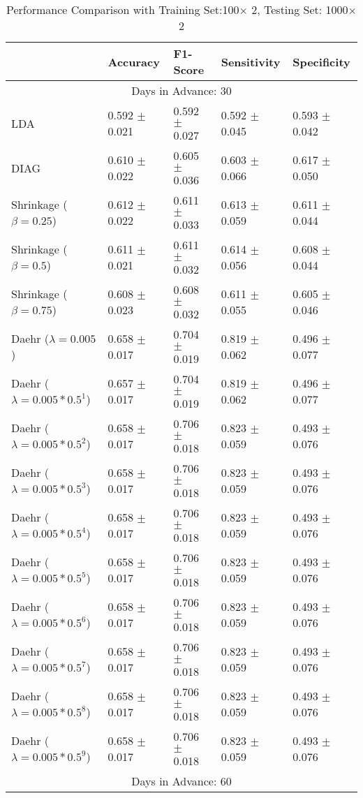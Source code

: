 \begin{table}
\caption{Performance Comparison with Training Set:100$\times$ 2, Testing Set: 1000$\times$2}
\footnotesize
\centering
\begin{tabular}{*{5}{l}}
\toprule
 & Accuracy & F1-Score & Sensitivity & Specificity\\
\hline\multicolumn{5}{c}{  Days in Advance: 30}\\\hline
LDA&0.592 $\pm$ 0.021&0.592 $\pm$ 0.027&0.592 $\pm$ 0.045&0.593 $\pm$ 0.042\\
DIAG&0.610 $\pm$ 0.022&0.605 $\pm$ 0.036&0.603 $\pm$ 0.066&0.617 $\pm$ 0.050\\
Shrinkage ($\beta=0.25$)&0.612 $\pm$ 0.022&0.611 $\pm$ 0.033&0.613 $\pm$ 0.059&0.611 $\pm$ 0.044\\
Shrinkage ($\beta=0.5$)&0.611 $\pm$ 0.021&0.611 $\pm$ 0.032&0.614 $\pm$ 0.056&0.608 $\pm$ 0.044\\
Shrinkage ($\beta=0.75$)&0.608 $\pm$ 0.023&0.608 $\pm$ 0.032&0.611 $\pm$ 0.055&0.605 $\pm$ 0.046\\
Daehr ($\lambda=0.005$)&0.658 $\pm$ 0.017&0.704 $\pm$ 0.019&0.819 $\pm$ 0.062&0.496 $\pm$ 0.077\\
Daehr ($\lambda=0.005*0.5^1$)&0.657 $\pm$ 0.017&0.704 $\pm$ 0.019&0.819 $\pm$ 0.062&0.496 $\pm$ 0.077\\
Daehr ($\lambda=0.005*0.5^2$)&0.658 $\pm$ 0.017&0.706 $\pm$ 0.018&0.823 $\pm$ 0.059&0.493 $\pm$ 0.076\\
Daehr ($\lambda=0.005*0.5^3$)&0.658 $\pm$ 0.017&0.706 $\pm$ 0.018&0.823 $\pm$ 0.059&0.493 $\pm$ 0.076\\
Daehr ($\lambda=0.005*0.5^4$)&0.658 $\pm$ 0.017&0.706 $\pm$ 0.018&0.823 $\pm$ 0.059&0.493 $\pm$ 0.076\\
Daehr ($\lambda=0.005*0.5^5$)&0.658 $\pm$ 0.017&0.706 $\pm$ 0.018&0.823 $\pm$ 0.059&0.493 $\pm$ 0.076\\
Daehr ($\lambda=0.005*0.5^6$)&0.658 $\pm$ 0.017&0.706 $\pm$ 0.018&0.823 $\pm$ 0.059&0.493 $\pm$ 0.076\\
Daehr ($\lambda=0.005*0.5^7$)&0.658 $\pm$ 0.017&0.706 $\pm$ 0.018&0.823 $\pm$ 0.059&0.493 $\pm$ 0.076\\
Daehr ($\lambda=0.005*0.5^8$)&0.658 $\pm$ 0.017&0.706 $\pm$ 0.018&0.823 $\pm$ 0.059&0.493 $\pm$ 0.076\\
Daehr ($\lambda=0.005*0.5^9$)&0.658 $\pm$ 0.017&0.706 $\pm$ 0.018&0.823 $\pm$ 0.059&0.493 $\pm$ 0.076\\
\hline\multicolumn{5}{c}{  Days in Advance: 60}\\\hline

\end{tabular}
\end{table}
